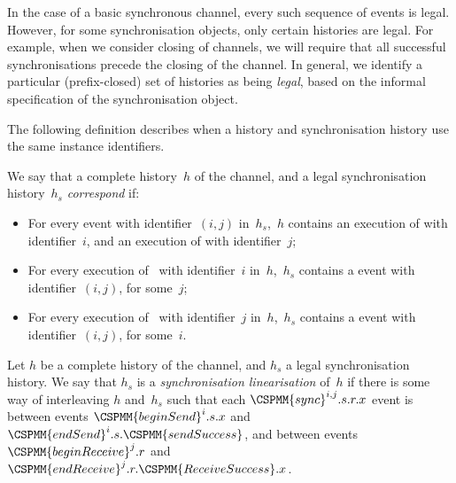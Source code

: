 In the case of a basic synchronous channel, every such sequence of 
events is legal.  However, for some synchronisation objects, only certain
histories are legal.  For example, when we consider closing of channels, we
will require that all successful synchronisations precede the closing of the
channel.  In general, we identify a particular (prefix-closed) set of
histories as being \emph{legal}, based on the informal specification of the
synchronisation object.

The following definition describes when a history and synchronisation history
use the same instance identifiers.
\begin{definition}
We say that a complete history~$h$ of the channel, and a legal synchronisation
history~$h_s$ \emph{correspond} if:
%
\begin{itemize}
\item For every  event with identifier~$(i,j)$ in~$h_s$,\, $h$
  contains an execution of  with identifier~$i$, and an execution
  of  with identifier~$j$;

\item For every execution of~ with identifier~$i$ in~$h$,\, $h_s$
  contains a  event with identifier~$(i,j)$, for some~$j$;

\item For every execution of~ with identifier~$j$ in~$h$,\,
  $h_s$ contains a  event with identifier~$(i,j)$, for some~$i$.
\end{itemize}
\end{definition}

\begin{definition}
\label{def:sync-lin}
Let $h$ be a complete history of the channel, and $h_s$ a legal
synchronisation history.  We say that $h_s$ is a \emph{synchronisation
  linearisation} of~$h$ if there is some way of interleaving $h$ and~$h_s$
such that each $\CSPMM{sync}^{i,j}.s.r.x$ event is between events
$\CSPMM{beginSend}^i.s.x$ and $\CSPMM{endSend}^i.s.\CSPMM{sendSuccess}$, and
between events $\CSPMM{beginReceive}^j.r$ and
$\CSPMM{endReceive}^j.r.\CSPMM{ReceiveSuccess}.x$. 
\end{definition}



